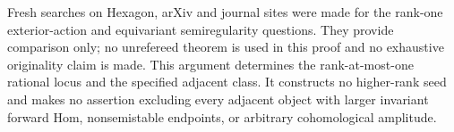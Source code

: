 Fresh searches on Hexagon, arXiv and journal sites were
made for the rank-one exterior-action and equivariant
semiregularity questions. They provide comparison only;
no unrefereed theorem is used in this proof and no
exhaustive originality claim is made. This argument
determines the rank-at-most-one rational locus and the
specified adjacent class. It constructs no higher-rank
seed and makes no assertion excluding every adjacent
object with larger invariant forward Hom, nonsemistable
endpoints, or arbitrary cohomological amplitude.
